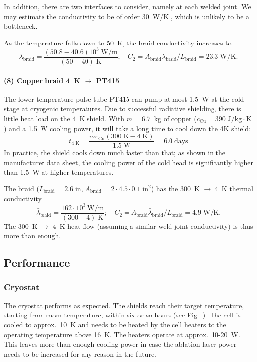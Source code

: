 In addition, there are two interfaces to consider, namely at each welded joint.
We may estimate the conductivity to be of order 30~W/K
\cite[Fig.~2.8]{ekin2006experimental}, which is unlikely to be a bottleneck.

As the temperature falls down to 50~K, the braid conductivity increases to
%
\[
   \bar\lambda_\text{braid}=\frac{(50.8-40.6)10^3\;\text{W/m}}{(50-40)\;\text{K}};
   \quad
   C_2=A_\text{braid}\bar\lambda_\text{braid}/L_\text{braid}=23.3\;\text{W/K}.
\]

\paragraph{(8) Copper braid 4~K $\rightarrow$ PT415}

The lower-temperature pulse tube PT415 can pump at most 1.5~W at the cold
stage at cryogenic temperatures. Due to successful radiative shielding, there is
little heat load on the 4~K shield. With $m=6.7$~kg of copper
($c_\text{Cu}=390\;\text{J/kg}\cdot\text{K}$) and a 1.5~W cooling power, it will
take a long time to cool down the 4K shield:
%
\[
   t_\text{4~K}=\frac{mc_\text{Cu}(300\;\text{K}-4\;\text{K})}{1.5\;\text{W}}=6.0\;\text{days}
\]
%
In practice, the shield cools down much faster than that; as shown in the
manufacturer data sheet, the cooling power of the cold head is significantly
higher than 1.5~W at higher temperatures.

The braid ($L_\text{braid}=2.6\;\text{in}$,
$A_\text{braid}=2\cdot4.5\cdot0.1\;\text{in}^2$) has the 300~K $\rightarrow$ 4~K thermal conductivity
%
\[
   \bar\lambda_\text{braid}=\frac{162\cdot10^3\;\text{W/m}}{(300-4)\;\text{K}};
   \quad
   C_2=A_\text{braid}\bar\lambda_\text{braid}/L_\text{braid}=4.9\;\text{W/K}.
\]
%
The 300~K $\rightarrow$ 4~K heat flow (assuming a similar weld-joint
conductivity) is thus more than enough.

\subsection{Performance}

\subsubsection{Cryostat}

The cryostat performs as expected. The shields reach their target temperature,
starting from room temperature, within six or so hours (see Fig.~).
The cell is cooled to approx.\ 10~K and needs to be heated by the cell heaters
to the operating temperature above 16~K. The heaters operate at approx.\
10-20~W. This leaves more than enough cooling power in case the ablation laser
power needs to be increased for any reason in the future.


